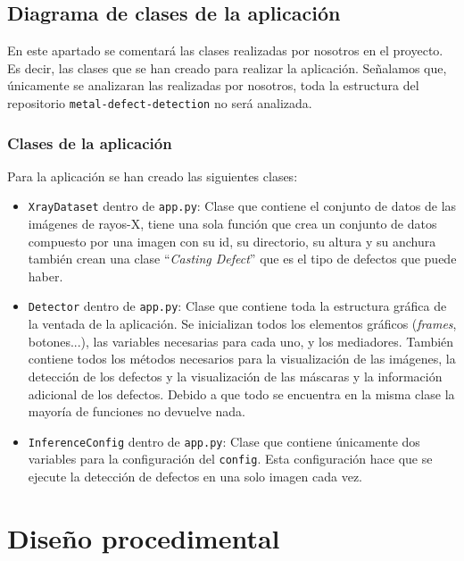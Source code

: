 \subsection{Diagrama de clases de la aplicación}

En este apartado se comentará las clases realizadas por nosotros en el proyecto. Es decir, las clases que se han creado para realizar la aplicación. Señalamos que, únicamente se analizaran las realizadas por nosotros, toda la estructura del repositorio \texttt{metal-defect-detection} \cite{metal-defect-detection:repositorio} no será analizada.

\subsubsection{Clases de la aplicación}

Para la aplicación se han creado las siguientes clases:

\begin{itemize}
    \item \texttt{XrayDataset} dentro de \texttt{app.py}: Clase que contiene el conjunto de datos de las imágenes de rayos-X, tiene una sola función que crea un conjunto de datos compuesto por una imagen con su id, su directorio, su altura y su anchura también crean una clase ``\textit{Casting Defect}'' que es el tipo de defectos que puede haber.
    \item \texttt{Detector} dentro de \texttt{app.py}: Clase que contiene toda la estructura gráfica de la ventada de la aplicación. Se inicializan todos los elementos gráficos (\textit{frames}, botones...), las variables necesarias para cada uno, y los mediadores. También contiene todos los métodos necesarios para la visualización de las imágenes, la detección de los defectos y la visualización de las máscaras y la información adicional de los defectos. Debido a que todo se encuentra en la misma clase la mayoría de funciones no devuelve nada.
    \item \texttt{InferenceConfig} dentro de \texttt{app.py}: Clase que contiene únicamente dos variables para la configuración del \texttt{config}. Esta configuración hace que se ejecute la detección de defectos en una solo imagen cada vez.
\end{itemize}


\section{Diseño procedimental}

